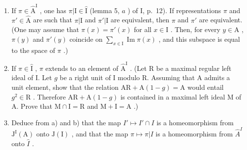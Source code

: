 \begin{enumerate}
\def\labelenumi{\alph{enumi})}
\item
  If \(\pi \in \widehat{\mathrm{A}}^{\mathrm{I}}\) , one has \(\pi | \mathrm{I} \in \widehat{\mathrm{I}}\) (lemma 5, \(a\) ) of I, p.~12). If representations \(\pi\) and \(\pi' \in \widehat{\mathrm{A}}\) are such that \(\pi | \mathrm{I}\) and \(\pi'|\mathrm{I}\) are equivalent, then \(\pi\) and \(\pi'\) are equivalent. (One may assume that \(\pi(x) = \pi'(x)\) for all \(x \in \mathrm{I}\) . Then, for every \(y \in \mathrm{A}\) , \(\pi(y)\) and \(\pi'(y)\) coincide on \(\sum_{x \in \mathrm{I}} \operatorname{Im} \pi(x)\) , and this subspace is equal to the space of \(\pi\) .)
\item
  If \(\pi \in \widehat{\mathrm{I}}\) , \(\pi\) extends to an element of \(\widehat{\mathrm{A}}^{\mathrm{I}}\) . (Let R be a maximal regular left ideal of I. Let \(g\) be a right unit of I modulo R. Assuming that A admits a unit element, show that the relation \(\mathrm{AR} + \mathrm{A}(1 - g) = \mathrm{A}\) would entail \(g^2 \in \mathrm{R}\) . Therefore \(\mathrm{AR} + \mathrm{A}(1 - g)\) is contained in a maximal left ideal M of A. Prove that \(\mathrm{M} \cap \mathrm{I} = \mathrm{R}\) and \(\mathrm{M} + \mathrm{I} = \mathrm{A}\) .)
\item
  Deduce from a) and b) that the map \(I'\mapsto I'\cap I\) is a homeomorphism from \(\mathrm{J}^{\mathrm{I}}(\mathrm{A})\) onto \(\mathrm{J}(\mathrm{I})\) , and that the map \(\pi\mapsto\pi|I\) is a homeomorphism from \(\widehat{A}^{I}\) onto \(\widehat{I}\) .
\end{enumerate}
